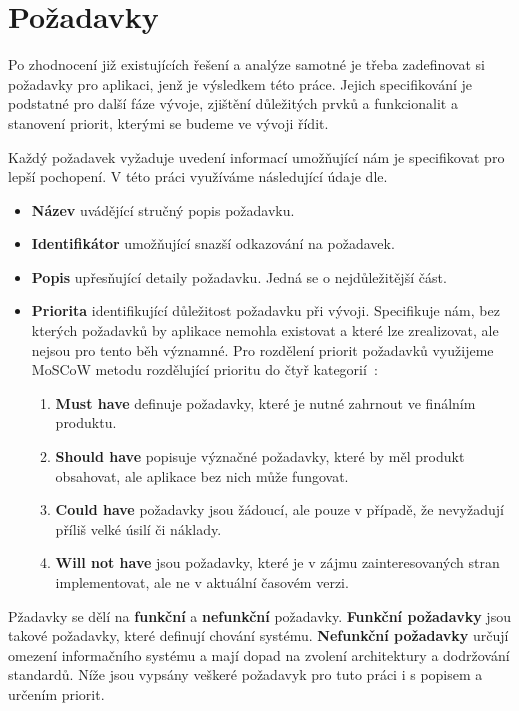 \section{Požadavky}
Po zhodnocení již existujících řešení a analýze samotné je třeba zadefinovat si požadavky
pro aplikaci, jenž je výsledkem této práce. Jejich specifikování je podstatné pro další fáze vývoje,
zjištění důležitých prvků a funkcionalit a stanovení priorit, kterými se budeme ve vývoji řídit.

Každý požadavek vyžaduje uvedení informací umožňující nám je specifikovat pro lepší pochopení. V této práci
využíváme následující údaje dle. %

\begin{itemize}
  \item \textbf{Název} uvádějící stručný popis požadavku.
  \item \textbf{Identifikátor} umožňující snazší odkazování na požadavek.
  \item \textbf{Popis} upřesňující detaily požadavku. Jedná se o nejdůležitější část.
  \item \textbf{Priorita} identifikující důležitost požadavku při vývoji. Specifikuje nám, 
  bez kterých požadavků by aplikace nemohla existovat a které lze zrealizovat, ale nejsou pro tento běh významné. 
  Pro rozdělení priorit požadavků využijeme MoSCoW metodu rozdělující prioritu do čtyř kategorií~\cite{moscow}:
   \begin{enumerate}
    \item \textbf{Must have} definuje požadavky, které je nutné zahrnout ve finálním produktu.
    \item \textbf{Should have} popisuje význačné požadavky, které by měl produkt obsahovat, ale aplikace bez nich může fungovat.
    \item \textbf{Could have} požadavky jsou žádoucí, ale pouze v případě, že nevyžadují příliš velké úsilí či náklady.
    \item \textbf{Will not have} jsou požadavky, které je v zájmu zainteresovaných stran implementovat, ale ne v aktuální časovém verzi.
    \end{enumerate}
\end{itemize}

Pžadavky se dělí na \textbf{funkční} a \textbf{nefunkční} požadavky. \textbf{Funkční požadavky} jsou takové požadavky, které
definují chování systému. \textbf{Nefunkční požadavky} určují omezení informačního systému a mají dopad na zvolení architektury a dodržování standardů.
Níže jsou vypsány veškeré požadavyk pro tuto práci i s popisem a určením priorit.

